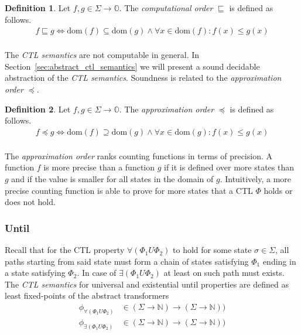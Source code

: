 \documentclass[11pt,a4paper,titlepage]{article}
\theoremstyle{definition}
\newtheorem{definition}{Definition}[section]
\begin{document}
\begin{definition}\label{def:computational_order}
    Let $f, g \in \Sigma \rightarrow \mathbb{O}$. 
    The \textit{computational order} $\sqsubseteq$ is defined as follows.
    \begin{align*}
        f \sqsubseteq g \iff \text{dom}(f) \subseteq \text{dom}(g) \land \forall x \in \text{dom}(f): f(x) \leq g(x) \\
    \end{align*}
\end{definition}

The \textit{CTL semantics} are not computable in general. In Section~\ref{sec:abstract_ctl_semantics} we will present a sound decidable
abstraction of the \textit{CTL semantics}. Soundness is related to the \textit{approximation order} $\preceq$.

\begin{definition}\label{def:approximation_order}
    Let $f, g \in \Sigma \rightarrow \mathbb{O}$. 
    The \textit{approximation order} $\preceq$ is defined as follows.
    \begin{align*}
        f \preceq g \iff \text{dom}(f) \supseteq \text{dom}(g) \land \forall x \in \text{dom}(g): f(x) \leq g(x) \\
    \end{align*}
\end{definition}

The \textit{approximation order} ranks counting functions in terms of precision. A function $f$ is more precise than a function $g$ if
it is defined over more states than $g$ and if the value is smaller for all states in the domain of $g$. Intuitively, a more precise 
counting function is able to prove for more states that a CTL $\Phi$ holds or does not hold.

\subsubsection*{Until}

Recall that for the CTL property $\forall(\Phi_1 U \Phi_2)$ to hold for some state $\sigma \in \Sigma$, 
all paths starting from said state must form a chain of states satisfying $\Phi_1$ ending in a state satisfying $\Phi_2$. 
In case of $\exists(\Phi_1 U \Phi_2)$ at least on such path must exists.
The \textit{CTL semantics} for universal and existential \textsf{until} properties are defined as least fixed-points of the abstract transformers
\begin{align*}
\phi_{\forall(\Phi_1 U \Phi_2)} &\in (\Sigma \rightarrow \mathbb{N}) \rightarrow (\Sigma \rightarrow \mathbb{N}))\\
\phi_{\exists(\Phi_1 U \Phi_2)} &\in (\Sigma \rightarrow \mathbb{N}) \rightarrow (\Sigma \rightarrow \mathbb{N}))
\end{align*}
\end{document}

